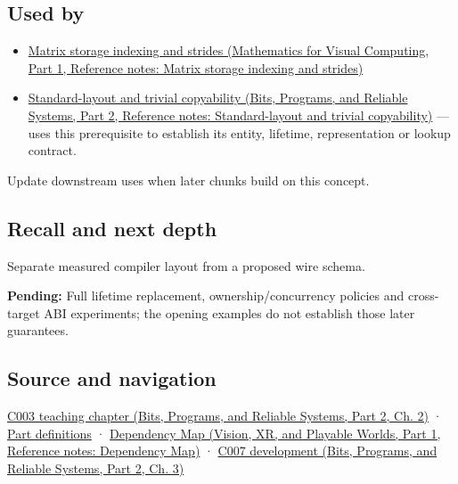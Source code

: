 \subsection{Used by}\label{appendix-c4ac6bb0fff8-used-by}

\hypertarget{appendix-c4ac6bb0fff8-used-by}{}

\begin{itemize}
\item
  \href{../02-Mathematics-for-Visual-Computing-P01/main.pdf\#nameddest=appendix-ffdc1d4e5350}{Matrix storage indexing and strides (Mathematics for Visual Computing, Part 1, Reference notes: Matrix storage indexing and strides)}
\item
  \href{../01-Bits-Programs-and-Reliable-Systems-P02/main.pdf\#nameddest=appendix-958870a64c53}{Standard-layout and trivial copyability (Bits, Programs, and Reliable Systems, Part 2, Reference notes: Standard-layout and trivial copyability)} --- uses this prerequisite to establish its entity, lifetime, representation or lookup contract.
\end{itemize}

Update downstream uses when later chunks build on this concept.

\subsection{Recall and next depth}\label{appendix-c4ac6bb0fff8-recall-and-next-depth}

\hypertarget{appendix-c4ac6bb0fff8-recall-and-next-depth}{}

Separate measured compiler layout from a proposed wire schema.

\textbf{Pending:} Full lifetime replacement, ownership/concurrency policies and cross-target ABI experiments; the opening examples do not establish those later guarantees.

\subsection{Source and navigation}\label{appendix-c4ac6bb0fff8-source-and-navigation}

\hypertarget{appendix-c4ac6bb0fff8-source-and-navigation}{}

\href{../01-Bits-Programs-and-Reliable-Systems-P02/main.pdf\#nameddest=01-foundations-i-ch002-where-the-bytes-live}{C003 teaching chapter (Bits, Programs, and Reliable Systems, Part 2, Ch. 2)} · \hyperref[appendix-fd090d982a15-m003---parts-41-60]{Part definitions} · \href{../07-Vision-XR-and-Playable-Worlds-P01/main.pdf\#nameddest=appendix-4ad47bdd269a}{Dependency Map (Vision, XR, and Playable Worlds, Part 1, Reference notes: Dependency Map)} · \href{../01-Bits-Programs-and-Reliable-Systems-P02/main.pdf\#nameddest=01-foundations-i-ch003-bringing-the-object-model-back-to-bytes}{C007 development (Bits, Programs, and Reliable Systems, Part 2, Ch. 3)}
